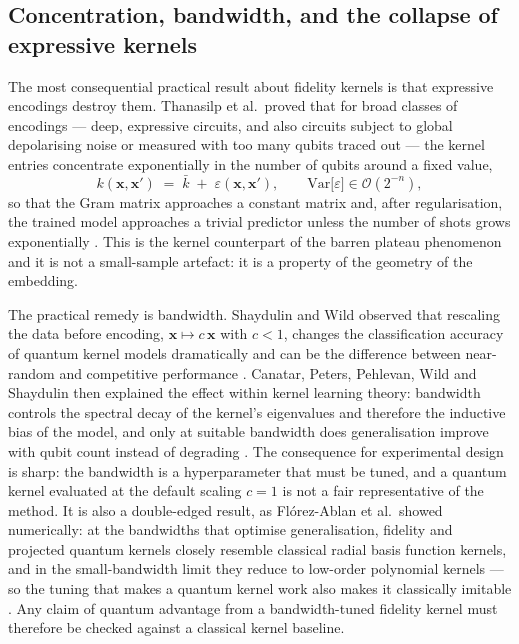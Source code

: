 \documentclass[Thesis.tex]{subfiles}
\begin{document}
\subsection{Concentration, bandwidth, and the collapse of expressive kernels}

The most consequential practical result about fidelity kernels is that
expressive encodings destroy them. Thanasilp et al.\ proved that for broad
classes of encodings --- deep, expressive circuits, and also circuits subject
to global depolarising noise or measured with too many qubits traced out ---
the kernel entries concentrate exponentially in the number of qubits around a
fixed value,
\begin{equation}
  k(\mathbf{x},\mathbf{x}') \;=\; \bar{k} \;+\; \varepsilon(\mathbf{x},\mathbf{x}'),
  \qquad
  \mathrm{Var}\bigl[\varepsilon\bigr] \in \mathcal{O}\!\left(2^{-n}\right),
  \label{eq2:concentration}
\end{equation}
so that the Gram matrix approaches a constant matrix and, after
regularisation, the trained model approaches a trivial predictor unless the
number of shots grows exponentially \cite{thanasilp2024exponential}. This is
the kernel counterpart of the barren plateau phenomenon and it is not a
small-sample artefact: it is a property of the geometry of the embedding.

The practical remedy is bandwidth. Shaydulin and Wild observed that rescaling
the data before encoding, $\mathbf{x} \mapsto c\,\mathbf{x}$ with $c < 1$,
changes the classification accuracy of quantum kernel models dramatically and
can be the difference between near-random and competitive performance
\cite{shaydulin2022importance}. Canatar, Peters, Pehlevan, Wild and Shaydulin
then explained the effect within kernel learning theory: bandwidth controls the
spectral decay of the kernel's eigenvalues and therefore the
inductive bias of the model, and only at suitable bandwidth does generalisation
improve with qubit count instead of degrading \cite{canatar2023bandwidth}.
The consequence for experimental design is sharp: the bandwidth is a
hyperparameter that must be tuned, and a quantum kernel evaluated at the
default scaling $c = 1$ is not a fair representative of the method. It is also
a double-edged result, as Fl\'orez-Ablan et al.\ showed numerically: at the
bandwidths that optimise generalisation, fidelity and projected quantum kernels
closely resemble classical radial basis function kernels, and in the
small-bandwidth limit they reduce to low-order polynomial kernels ---
so the tuning that makes a quantum kernel work also makes it
classically imitable \cite{florezablan2025similarity}. Any claim of quantum
advantage from a bandwidth-tuned fidelity kernel must therefore be checked
against a classical kernel baseline.
\end{document}
